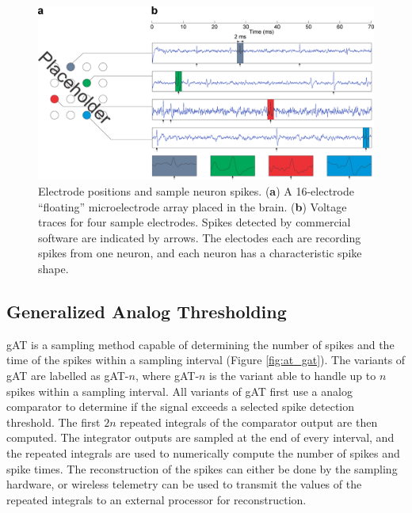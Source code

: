\documentclass[10 pt]{article}
\begin{document}
\begin{figure}[htbp]
\begin{center}
\includegraphics[scale=0.22]{sample.eps}
\caption{Electrode positions and sample neuron spikes. (\textbf{a}) A 16-electrode ``floating'' microelectrode array placed in the brain. (\textbf{b}) Voltage traces for four sample electrodes. Spikes detected by commercial software \cite{???} are indicated by arrows. The electodes each are recording spikes from one neuron, and each neuron has a characteristic spike shape.} %
\label{fig:sample}
\end{center}
\end{figure}

\subsection{Generalized Analog Thresholding}

gAT is a sampling method capable of determining the number of spikes and the time of the spikes within a sampling interval (Figure \ref{fig:at_gat}).
The variants of gAT are labelled as gAT-$n$, where gAT-$n$ is the variant able to handle up to $n$ spikes within a sampling interval.
All variants of gAT first use a analog comparator to determine if the signal exceeds a selected spike detection threshold.
The first $2n$ repeated integrals of the comparator output are then computed.
The integrator outputs are sampled at the end of every interval, and the repeated integrals are used to numerically compute the number of spikes and spike times.
The reconstruction of the spikes can either be done by the sampling hardware, or wireless telemetry can be used to transmit the values of the repeated integrals to an external processor for reconstruction.
\end{document}
